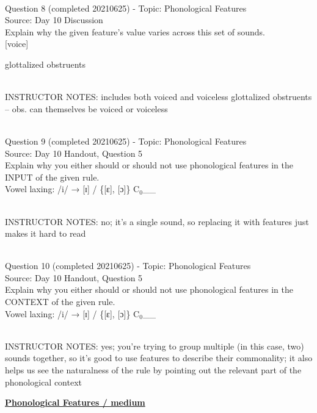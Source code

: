 \documentclass[12pt]{article}
\begin{document}
~\\

{\large Question 8} (completed 20210625) - Topic: Phonological Features\\
Source: Day 10 Discussion\\

Explain why the given feature's value varies across this set of sounds.\\

{[voice]}

glottalized obstruents


~\\
INSTRUCTOR NOTES: includes both voiced and voiceless glottalized obstruents -- obs. can themselves be voiced or voiceless


~\\

{\large Question 9} (completed 20210625) - Topic: Phonological Features\\
Source: Day 10 Handout, Question 5\\

Explain why you either should or should not use phonological features in the INPUT of the given rule.\\

Vowel laxing: /i/ → {[ɪ]} / \{{[ɛ]}, {[ɔ]}\} C$_0$\_\_


~\\
INSTRUCTOR NOTES: no; it's a single sound, so replacing it with features just makes it hard to read


~\\

{\large Question 10} (completed 20210625) - Topic: Phonological Features\\
Source: Day 10 Handout, Question 5\\

Explain why you either should or should not use phonological features in the CONTEXT of the given rule.\\

Vowel laxing: /i/ → {[ɪ]} / \{{[ɛ]}, {[ɔ]}\} C$_0$\_\_


~\\
INSTRUCTOR NOTES: yes; you're trying to group multiple (in this case, two) sounds together, so it's good to use features to describe their commonality; it also helps us see the naturalness of the rule by pointing out the relevant part of the phonological context


\newpage\textbf{\underline{\huge Phonological Features / medium\\}}
\end{document}
